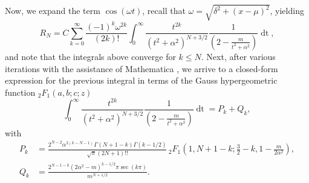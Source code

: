 \documentclass[10pt,a4paper,oneside]{article}
\numberwithin{equation}{section}
\begin{document}
Now, we expand the term $\cos(\omega t)$, recall that $\omega = \sqrt{\delta^2 + (x-\mu)^2}$, yielding
\begin{equation}\label{convergent_remainder_series_integral}
R_N = C \sum_{k=0}^{\infty} \frac{(-1)^k \omega^{2k}}{(2k)!} \int_0^{\infty} \frac{t^{2k}}{(t^2 + \alpha^2)^{N + 3/2}} \frac{1}{\left(2 - \frac{m}{t^2+ \alpha^2}\right)} \mathop{dt},
\end{equation}
and note that the integrals above converge for $k \le N$. Next, after various iterations with the assistance of Mathematica \cite{Mathematica}, we arrive to a closed-form expression for the previous integral in terms of the Gauss hypergeometric function $_2F_1(a, b; c; z)$
\begin{equation}\label{convergent_remainder_inner_integral}
\int_0^{\infty} \frac{t^{2k}}{(t^2 + \alpha^2)^{N + 3/2}} \frac{1}{\left(2 - \frac{m}{t^2+ \alpha^2}\right)} \mathop{dt} = P_k + Q_k,
\end{equation}
with
\begin{align}
P_k &= \frac{2^{N-2}\alpha^{2(k - N - 1)} \Gamma(N + 1 - k) \Gamma(k - 1/2)}{\sqrt{\pi} (2N + 1)!!} \, _2F_1\left(1, N + 1 - k; \frac{3}{2} -k, 1 - \frac{m}{2\alpha^2}\right),\\
Q_k &= \frac{2^{N-1-k}(2\alpha^2 - m)^{k - 1/2} \pi \sec(k\pi)}{m^{N + 1/2}}.
\end{align}
\end{document}
